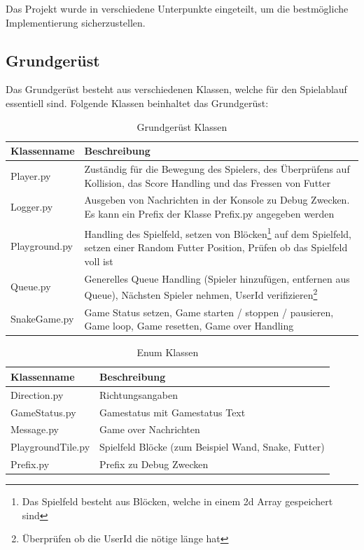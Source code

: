 \documentclass[a4paper,12pt]{scrartcl}
\begin{document}

Das Projekt wurde in verschiedene Unterpunkte eingeteilt, um die bestmögliche Implementierung sicherzustellen.


\subsection{Grundgerüst}
\label{grundgerüst}
Das Grundgerüst besteht aus verschiedenen Klassen, welche für den Spielablauf essentiell sind. Folgende Klassen beinhaltet das Grundgerüst:

\newpage

\begin{table}[!htb]
\centering
\begin{tabular}{p{4cm}|p{10cm}}
Klassenname & Beschreibung \\
\hline
Player.py & Zuständig für die Bewegung des Spielers, des Überprüfens auf Kollision, das Score Handling und das Fressen von Futter \\
Logger.py & Ausgeben von Nachrichten in der Konsole zu Debug Zwecken. Es kann ein Prefix der Klasse Prefix.py angegeben werden \\
Playground.py & Handling des Spielfeld, setzen von Blöcken\footnote{Das Spielfeld besteht aus Blöcken, welche in einem 2d Array gespeichert sind} auf dem Spielfeld, setzen einer Random Futter Position, Prüfen ob das Spielfeld voll ist \\
Queue.py & Generelles Queue Handling (Spieler hinzufügen, entfernen aus Queue), Nächsten Spieler nehmen, UserId verifizieren\footnote{Überprüfen ob die UserId die nötige länge hat} \\
SnakeGame.py & Game Status setzen, Game starten / stoppen / pausieren, Game loop, Game resetten, Game over Handling \\
\end{tabular}
\caption{Grundgerüst Klassen}
\end{table}

\begin{table}[!htb]
\centering
\begin{tabular}{p{4cm}|p{10cm}}
Klassenname & Beschreibung \\
\hline
Direction.py & Richtungsangaben \\
GameStatus.py & Gamestatus mit Gamestatus Text \\
Message.py & Game over Nachrichten \\
PlaygroundTile.py & Spielfeld Blöcke (zum Beispiel Wand, Snake, Futter) \\
Prefix.py & Prefix zu Debug Zwecken \\
\end{tabular}
\caption{Enum Klassen}
\end{table}
\end{document}
